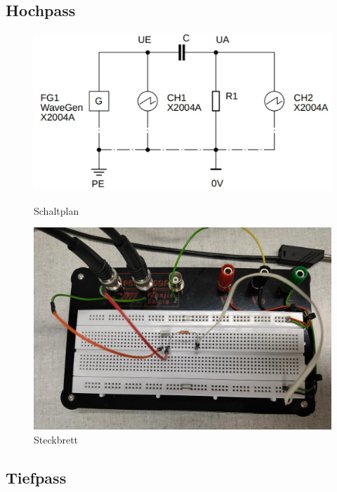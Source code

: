 \documentclass[12pt,a4paper,twoside]{article}
\begin{document}
\subsection{Hochpass}

\begin{figure}[H]
    \begin{minipage}[b]{.5\linewidth} %
        \includegraphics[width=1\linewidth]{nudes/Aufgabe 1 schaltplan.jpg}
        \caption{Schaltplan }
        \label{fig:a1s}
    \end{minipage}
    \hspace{0.01\linewidth}%
    \begin{minipage}[b]{.5\linewidth} %
        \includegraphics[width=1\linewidth]{nudes/a1 brett.jpg}
    \caption{Steckbrett}
    \label{fig:a1b}
    \end{minipage}
\end{figure}


\subsection{Tiefpass}
\end{document}
